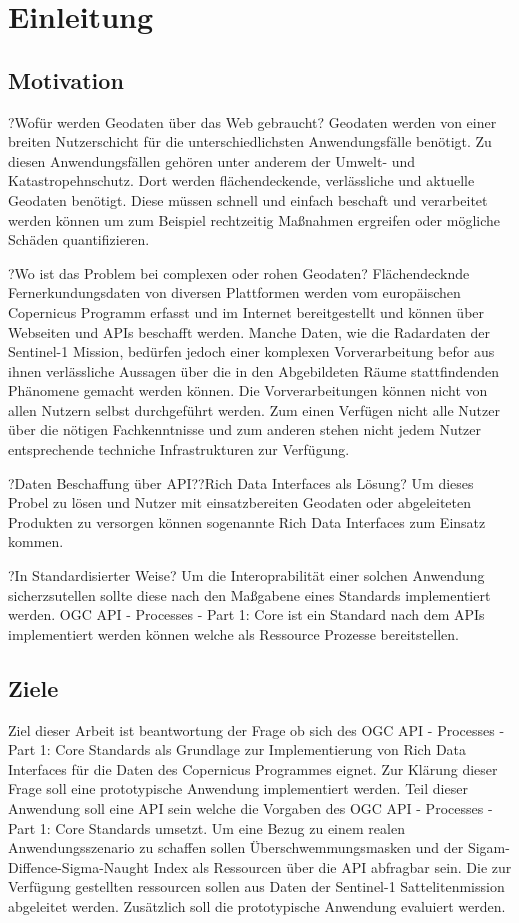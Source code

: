 \newpage
\restoregeometry
\section{Einleitung}
\subsection{Motivation}
?Wofür werden Geodaten über das Web gebraucht?
Geodaten werden von einer breiten Nutzerschicht für die unterschiedlichsten Anwendungsfälle benötigt.
Zu diesen Anwendungsfällen gehören unter anderem der Umwelt- und Katastropehnschutz. Dort werden flächendeckende,
verlässliche und aktuelle Geodaten benötigt. Diese müssen schnell und einfach beschaft und verarbeitet werden können
um zum Beispiel rechtzeitig Maßnahmen ergreifen oder mögliche Schäden quantifizieren. 

?Wo ist das Problem bei complexen oder rohen Geodaten?
Flächendecknde Fernerkundungsdaten von diversen Plattformen werden vom europäischen Copernicus Programm 
erfasst und im Internet bereitgestellt und können über Webseiten und APIs beschafft werden. 
Manche Daten, wie die Radardaten der Sentinel-1 Mission, bedürfen jedoch einer komplexen Vorverarbeitung befor aus ihnen verlässliche Aussagen über die in den Abgebildeten Räume 
stattfindenden Phänomene gemacht werden können. Die Vorverarbeitungen können nicht von allen Nutzern selbst durchgeführt werden. Zum einen Verfügen nicht alle Nutzer über die 
nötigen Fachkenntnisse und zum anderen stehen nicht jedem Nutzer entsprechende techniche Infrastrukturen zur Verfügung. 

?Daten Beschaffung über API??Rich Data Interfaces als Lösung?
Um dieses Probel zu lösen und Nutzer mit einsatzbereiten Geodaten oder abgeleiteten Produkten zu versorgen können sogenannte Rich Data Interfaces zum Einsatz kommen.  

?In Standardisierter Weise?
Um die Interoprabilität einer solchen Anwendung sicherzsutellen sollte diese nach den Maßgabene eines Standards implementiert werden. OGC API - Processes - Part 1: Core ist ein 
Standard nach dem APIs implementiert werden können welche als Ressource Prozesse bereitstellen. 

\subsection{Ziele}
Ziel dieser Arbeit ist beantwortung der Frage ob sich des OGC API - Processes - Part 1: Core Standards als Grundlage zur Implementierung von Rich Data Interfaces für die 
Daten des Copernicus Programmes eignet.  
Zur Klärung dieser Frage soll eine prototypische Anwendung implementiert werden. Teil dieser Anwendung soll eine API sein welche die Vorgaben des OGC API - Processes - Part 1: Core Standards 
umsetzt. Um eine Bezug zu einem realen Anwendungsszenario zu schaffen sollen Überschwemmungsmasken und der Sigam-Diffence-Sigma-Naught Index als Ressourcen über die API abfragbar sein. 
Die zur Verfügung gestellten ressourcen sollen aus Daten der Sentinel-1 Sattelitenmission abgeleitet werden.  
Zusätzlich soll die prototypische Anwendung evaluiert werden.
